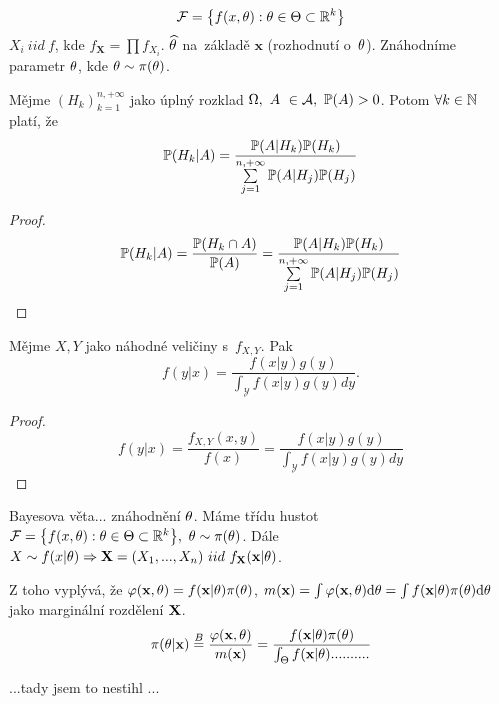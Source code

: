 $$ \mathcal{F}=\big\{ f(x,\theta):\theta\in\Theta\subset\mathbb{R}^k \big\} $$
$X_i~iid~f$, kde $f_\textbf{X}=\prod f_{X_i}$. $\widehat{\theta}$ na~základě $\textbf{x}$ (rozhodnutí o~$\theta$). Znáhodníme parametr $\theta$, kde $\theta\sim\pi(\theta)$.
\begin{theorem}[Bayesova] 
	Mějme $(H_k)_{k=1}^{n,+\infty}$ jako úplný rozklad $\Omega,~A~\in \mathcal{A} , ~\mathbb{P}(A)>0$. Potom $\forall k\in\mathbb{N}$ platí, že 
	\[
	\mathbb{P}(H_k|A)=\frac{\mathbb{P}(A|H_k)\mathbb{P}(H_k)}{\sum\limits_{j=1}^{n,+\infty}\mathbb{P}(A|H_j)\mathbb{P}(H_j)}
	\]
	\begin{proof}
		$$\mathbb{P}(H_k|A)=\frac{\mathbb{P}(H_k\cap A)}{\mathbb{P}(A)}=\frac{\mathbb{P}(A|H_k)\mathbb{P}(H_k)}{\sum\limits_{j=1}^{n,+\infty}\mathbb{P}(A|H_j)\mathbb{P}(H_j)}$$
	\end{proof}
\end{theorem}
\begin{theorem}
	Mějme $X,Y$ jako náhodné veličiny s~$f_{X,Y}$. Pak
	$$ f(y|x)=\frac{f(x|y)g(y)}{\int_{\mathcal{Y}}f(x|y)g(y)dy}. $$
\begin{proof}
$$ f(y|x)=\frac{f_{X,Y}(x,y)}{f(x)}=\frac{f(x|y)g(y)}{\int_{\mathcal{Y}}f(x|y)g(y)dy} $$
\end{proof}

\end{theorem}

\begin{remark}
	Bayesova věta... znáhodnění $\theta$. Máme třídu hustot $\mathcal{F}=\big\{f(x,\theta):\theta\in\Theta\subset\mathbb{R}^k\big\},~\theta\sim\pi(\theta)$. Dále $X\sim f(x|\theta)\Rightarrow \textbf{X}=(X_1,...,X_n)~iid~f_{\textbf{X}}(\textbf{x}|\theta)$.
	
	Z toho vyplývá, že $\varphi(\textbf{x},\theta)=f(\textbf{x}|\theta)\pi(\theta)$, $m(\textbf{x})=\int\varphi(\textbf{x},\theta)\mathrm{d} \theta=\int f(\textbf{x}|\theta)\pi(\theta)\mathrm{d}\theta$ jako marginální rozdělení $\textbf{X}$. 
	$$ \pi(\theta|\textbf{x})\stackrel{B}{=}\frac{\varphi(\textbf{x},\theta)}{m(\textbf{x})}=\frac{f(\textbf{x}|\theta)\pi(\theta)}{\int_\Theta f(\textbf{x}|\theta)..........} $$
\end{remark}
...tady jsem to nestihl ...

